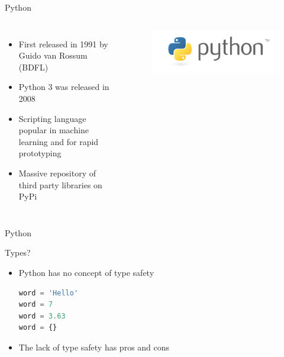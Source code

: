 \documentclass[aspectratio=169,xcolor=dvipsnames]{beamer}
\begin{document}
\begin{frame}{Python}
  \begin{columns}[c]
    \begin{itemize}
        \item First released in 1991 by Guido van Rossum (BDFL)
        \item Python 3 was released in 2008
        \item Scripting language popular in machine learning and for rapid prototyping
        \item Massive repository of third party libraries on PyPi
    \end{itemize}

    \begin{figure}
        \includegraphics[width=1.0\textwidth]{python.png}
    \end{figure}
  \end{columns}
\end{frame}


\begin{frame}{Python}
  \begin{example}
    
  \end{example}
\end{frame}


\begin{frame}[fragile]{Types?}
  \begin{itemize}
    \item Python has no concept of type safety
    \begin{example}
        \begin{lstlisting}[language=Python]
word = 'Hello'
word = 7
word = 3.63
word = {}
        \end{lstlisting}
    \end{example}
    \item The lack of type safety has pros and cons
  \end{itemize}
\end{frame}
\end{document}
